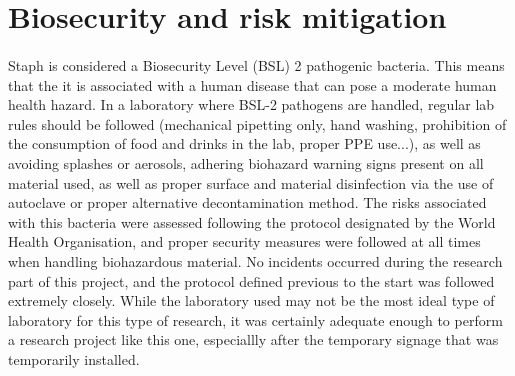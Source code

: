 \section{Biosecurity and risk mitigation}
\paragraph{}Staph is considered a Biosecurity Level (BSL) 2 pathogenic bacteria\cite{cheungPathogenicityVirulenceStaphylococcus2021}. This means that the it is associated with a human disease that can pose a moderate human health hazard. In a laboratory where BSL-2 pathogens are handled, regular lab rules should be followed (mechanical pipetting only, hand washing, prohibition of the consumption of food and drinks in the lab, proper PPE use...), as well as avoiding splashes or aerosols, adhering biohazard warning signs present on all material used, as well as proper surface and material disinfection via the use of autoclave or proper alternative decontamination method\cite{worldhealthorganizationLaboratoryBiosafetyManual2020}.\newline
The risks associated with this bacteria were assessed following the protocol designated by the World Health Organisation, and proper security measures were followed at all times when handling biohazardous material. No incidents occurred during the research part of this project, and the protocol defined previous to the start was followed extremely closely. While the laboratory used may not be the most ideal type of laboratory for this type of research, it was certainly adequate enough to perform a research project like this one, especiallly after the temporary signage that was temporarily installed.
